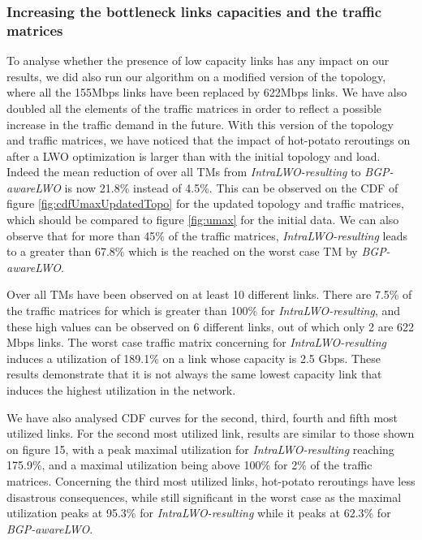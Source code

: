 \documentclass{acm_proc_article-sp}
\begin{document}
\subsubsection{Increasing the bottleneck links capacities and the traffic matrices}

To analyse whether the presence of low capacity links has any impact on our results, we did also run our
algorithm on a modified version of the topology, where all the 155Mbps links have
been replaced by 622Mbps links. We have also doubled all the elements of the traffic
matrices in order to reflect a possible increase in the traffic demand in
the future. With this version of the topology and traffic matrices, we have noticed that
the impact of hot-potato reroutings on  after a LWO optimization is larger than with the
initial topology and load. Indeed the mean reduction of  over all TMs from \textit{IntraLWO-resulting}
to \textit{BGP-awareLWO} is now 21.8\% instead of 4.5\%. This can be observed
on the CDF of figure \ref{fig:cdfUmaxUpdatedTopo} for the updated topology and
traffic matrices, which should be compared to figure \ref{fig:umax} for
the initial data. We can also observe that for more than 45\% of the traffic matrices,
\textit{IntraLWO-resulting} leads to a  greater than 67.8\% which is the 
reached on the worst case TM by \textit{BGP-awareLWO}.

Over all TMs  have been observed on at least 10 different links. There are 7.5\%
of the traffic matrices for which 
is greater than 100\% for \textit{IntraLWO-resulting}, and these high  values
can be observed on 6 different links, out of which only 2 are 622 Mbps links.
The worst case traffic matrix concerning  for \textit{IntraLWO-resulting}
induces a utilization of 189.1\% on a link whose capacity is 2.5 Gbps.
These results demonstrate that it is not always the same lowest capacity link that induces
the highest utilization in the network.

We have also analysed CDF curves for the second, third, fourth and fifth most utilized links.
For the second most utilized link, results are similar to those shown on figure 15, with a peak
maximal utilization for \textit{IntraLWO-resulting} reaching 175.9\%, and a maximal utilization
being above 100\% for 2\% of the traffic matrices. Concerning the third most utilized links,
hot-potato reroutings have less disastrous consequences, while still significant in the worst
case as the maximal utilization peaks at 95.3\% for \textit{IntraLWO-resulting} while it
peaks at 62.3\% for \textit{BGP-awareLWO}.
\end{document}
